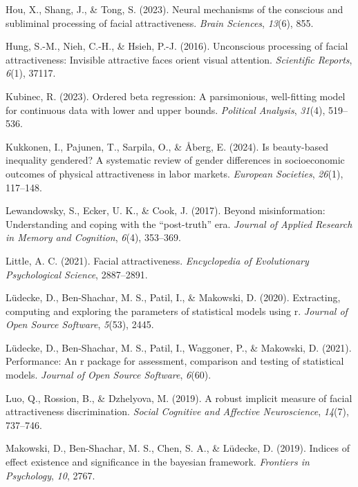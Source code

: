 \documentclass[
  jou,
  floatsintext,
  longtable,
  nolmodern,
  notxfonts,
  notimes,
  colorlinks=true,linkcolor=blue,citecolor=blue,urlcolor=blue]{apa7}
\newlength{\cslhangindent}
\newenvironment{CSLReferences}[2] %
 {\begin{list}{}{%
  \setlength{\itemindent}{0pt}
  \setlength{\leftmargin}{0pt}
  \setlength{\parsep}{0pt}
  \ifodd #1
   \setlength{\leftmargin}{\cslhangindent}
   \setlength{\itemindent}{-1\cslhangindent}
  \fi
  \setlength{\itemsep}{#2\baselineskip}}}
 {\end{list}}
\begin{document}
\begin{CSLReferences}{1}{0}
Hou, X., Shang, J., \& Tong, S. (2023). Neural mechanisms of the
conscious and subliminal processing of facial attractiveness.
\emph{Brain Sciences}, \emph{13}(6), 855.

Hung, S.-M., Nieh, C.-H., \& Hsieh, P.-J. (2016). Unconscious processing
of facial attractiveness: Invisible attractive faces orient visual
attention. \emph{Scientific Reports}, \emph{6}(1), 37117.

Kubinec, R. (2023). Ordered beta regression: A parsimonious,
well-fitting model for continuous data with lower and upper bounds.
\emph{Political Analysis}, \emph{31}(4), 519--536.

Kukkonen, I., Pajunen, T., Sarpila, O., \& Åberg, E. (2024). Is
beauty-based inequality gendered? A systematic review of gender
differences in socioeconomic outcomes of physical attractiveness in
labor markets. \emph{European Societies}, \emph{26}(1), 117--148.

Lewandowsky, S., Ecker, U. K., \& Cook, J. (2017). Beyond
misinformation: Understanding and coping with the {``post-truth''} era.
\emph{Journal of Applied Research in Memory and Cognition}, \emph{6}(4),
353--369.

Little, A. C. (2021). Facial attractiveness. \emph{Encyclopedia of
Evolutionary Psychological Science}, 2887--2891.

Lüdecke, D., Ben-Shachar, M. S., Patil, I., \& Makowski, D. (2020).
Extracting, computing and exploring the parameters of statistical models
using r. \emph{Journal of Open Source Software}, \emph{5}(53), 2445.

Lüdecke, D., Ben-Shachar, M. S., Patil, I., Waggoner, P., \& Makowski,
D. (2021). Performance: An r package for assessment, comparison and
testing of statistical models. \emph{Journal of Open Source Software},
\emph{6}(60).

Luo, Q., Rossion, B., \& Dzhelyova, M. (2019). A robust implicit measure
of facial attractiveness discrimination. \emph{Social Cognitive and
Affective Neuroscience}, \emph{14}(7), 737--746.

Makowski, D., Ben-Shachar, M. S., Chen, S. A., \& Lüdecke, D. (2019).
Indices of effect existence and significance in the bayesian framework.
\emph{Frontiers in Psychology}, \emph{10}, 2767.


\end{CSLReferences}
\end{document}
